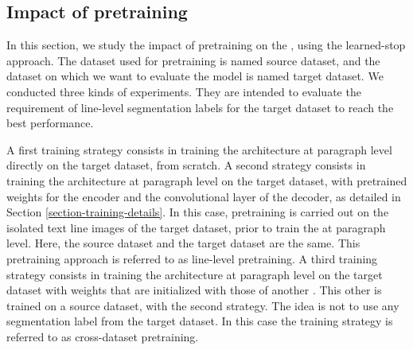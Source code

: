 \begin{table}[!h]
    \caption{Training details of state-of-the-art approaches.}
    \centering
    \label{table:sota-details}
\end{table}


\subsection{Impact of pretraining}
\label{section-pretraining}

In this section, we study the impact of pretraining on the \modelacc{}, using the learned-stop approach. The dataset used for pretraining is named source dataset, and the dataset on which we want to evaluate the model is named target dataset. We conducted three kinds of experiments. They are intended to evaluate the requirement of line-level segmentation labels for the target dataset to reach the best performance. 

A first training strategy consists in training the architecture at paragraph level directly on the target dataset, from scratch. 
A second strategy consists in training the architecture at paragraph level on the target dataset, with pretrained weights for the encoder and the convolutional layer of the decoder, as detailed in Section \ref{section-training-details}. In this case, pretraining is carried out on the isolated text line images of the target dataset, prior to train the \modelacc{} at paragraph level. Here, the source dataset and the target dataset are the same. This pretraining approach is referred to as line-level pretraining.
A third training strategy consists in training the architecture at paragraph level on the target dataset with weights that are initialized with those of another \modelacc{}. This other \modelacc{} is trained on a source dataset, with the second strategy. The idea is not to use any segmentation label from the target dataset. In this case the training strategy is referred to as cross-dataset pretraining.

